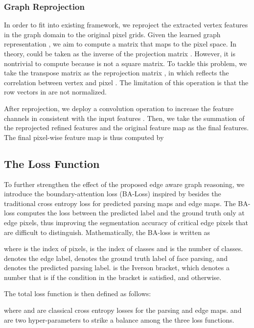 \documentclass[runningheads]{llncs}
\begin{document}
\subsubsection{Graph Reprojection}

In order to fit into existing framework, we reproject the extracted vertex features in the graph domain to the original pixel grids.
Given the learned graph representation , we aim to compute a matrix  that maps  to the pixel space.
In theory,  could be taken as the inverse of the projection matrix . However, it is nontrivial to compute because  is not a square matrix. 
To tackle this problem, we take the transpose matrix  as the reprojection matrix \cite{li2018beyond}, in which  reflects the correlation between vertex  and pixel . The limitation of this operation is that the row vectors in  are not normalized.

After reprojection, we deploy a  convolution operation  to increase the feature channels in consistent with the input features . 
Then, we take the summation of the reprojected refined features and the original feature map as the final features.
The final pixel-wise feature map  is thus computed by 




\subsection{The Loss Function}
To further strengthen the effect of the proposed edge aware graph reasoning, we introduce the boundary-attention loss (BA-Loss) inspired by \cite{liu2020new} besides the traditional cross entropy loss for predicted parsing maps and edge maps.
The BA-loss computes the loss between the predicted label and the ground truth only at edge pixels, thus improving the segmentation accuracy of critical edge pixels that are difficult to distinguish.
Mathematically, the BA-loss is written as 

where  is the index of pixels,  is the index of classes and  is the number of classes.  denotes the edge label,  denotes the ground truth label of face parsing, and  denotes the predicted parsing label. 
 is the Iverson bracket, which denotes a number that is  if the condition in the bracket is satisfied, and  otherwise. 

The total loss function is then defined as follows:

where  and  are classical cross entropy losses for the parsing and edge maps.
 and  are two hyper-parameters to strike a balance among the three loss functions.  
\end{document}
